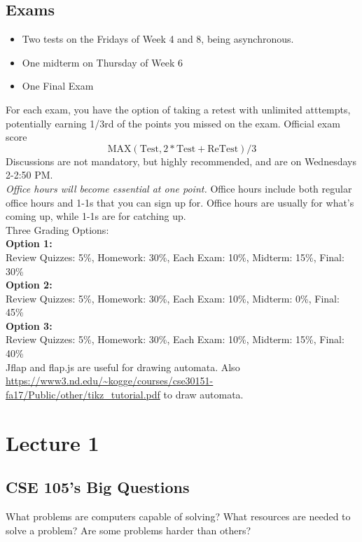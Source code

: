 \documentclass[a4paper, 12pt, margin=1.2in]{article}
\begin{document}
\subsection*{Exams}
\begin{itemize}
    \item Two tests on the Fridays of Week 4 and 8, being asynchronous.
    \item One midterm on Thursday of Week 6
    \item One Final Exam
\end{itemize} 
For each exam, you have the option of taking a retest with unlimited atttempts, potentially earning 1/3rd of the points you missed on the exam.
Official exam score 
\[
    \text{MAX} (\text{Test}, 2*\text{Test} + \text{ReTest})/3
\]
Discussions are not mandatory, but highly recommended, and are on Wednesdays 2-2:50 PM. \\
\textit{Office hours will become essential at one point.} Office hours include both regular office hours and 1-1s that you can sign up for. Office hours are usually for what's coming up, while 1-1s are for catching up.  \\
Three Grading Options: \\
\textbf{Option 1:}\\
Review Quizzes: 5\%, Homework: 30\%, Each Exam: 10\%, Midterm: 15\%, Final: 30\% \\
\textbf{Option 2:}\\
Review Quizzes: 5\%, Homework: 30\%, Each Exam: 10\%, Midterm: 0\%, Final: 45\% \\ 
\textbf{Option 3:}\\
Review Quizzes: 5\%, Homework: 30\%, Each Exam: 10\%, Midterm: 15\%, Final: 40\%\\ 
Jflap and flap.js are useful for drawing automata. Also \url{https://www3.nd.edu/~kogge/courses/cse30151-fa17/Public/other/tikz_tutorial.pdf} to draw automata. 

\newpage
\section{Lecture 1}

\subsection{CSE 105's Big Questions}
What problems are computers capable of solving?
What resources are needed to solve a problem?
Are some problems harder than others? 
\end{document}
